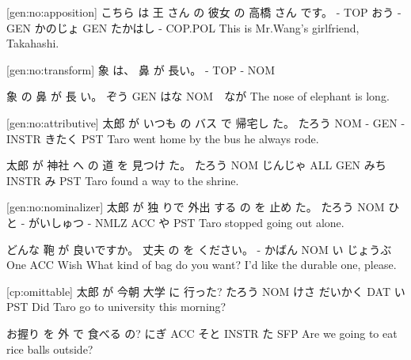 [gen:no:apposition]
こちら は  王 さん の  彼女    の  高橋   さん です。
-    TOP おう - GEN かのじょ GEN たかはし - COP.POL
This is Mr.Wang's girlfriend, Takahashi.

[gen:no:transform]
象 は、 鼻 が  長い。
-  TOP - NOM

象   の   鼻  が   長 い。
ぞう GEN はな NOM　なが
The nose of elephant is long.

[gen:no:attributive]
太郎   が いつも の  バス で    帰宅し た。
たろう NOM -   GEN  - INSTR きたく PST
Taro went home by the bus he always rode.

太郎   が  神社    へ   の  道   を    見つけ た。
たろう NOM じんじゃ ALL GEN みち INSTR み    PST
Taro found a way to the shrine.


[gen:no:nominalizer]
太郎   が  独 りで 外出 する   の    を  止め た。
たろう NOM ひと - がいしゅつ - NMLZ ACC や PST
Taro stopped going out alone.

どんな 鞄   が   良いですか。 丈夫    の  を ください。
-    かばん NOM い         じょうぶ One ACC Wish
What kind of bag do you want? I'd like the durable one, please.

[cp:omittable]
太郎   が  今朝 大学    に   行った?
たろう NOM けさ だいかく DAT い PST
Did Taro go to university this morning?

お握り を   外  で      食べる の?
にぎ   ACC そと INSTR  た SFP
Are we going to eat rice balls outside?
